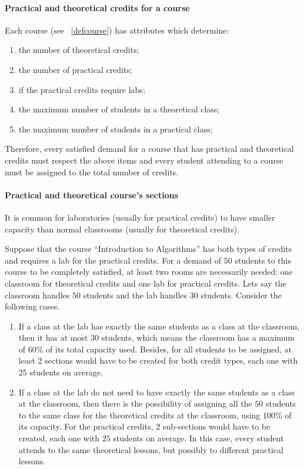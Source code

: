 \paragraph{Practical and theoretical credits for a course}
\label{constrptcourse}

Each course (see ~\ref{defcourse}) has attributes which determine:

\begin{enumerate}
\item the number of theoretical credits;
\item the number of practical credits;
\item if the practical credits require labs;
\item the maximum number of students in a theoretical class;
\item the maximum number of students in a practical class;
\end{enumerate}

Therefore, every satisfied demand for a course that has practical and theoretical credits must respect the above items and every student attending to a course must be assigned to the total number of credits.


\paragraph{Practical and theoretical course's sections}
\label{constrptrelation}

It is common for laboratories (usually for practical credits) to have smaller capacity than normal classrooms (usually for theoretical credits).

Suppose that the course ``Introduction to Algorithms'' has both types of credits and requires a lab for the practical credits.  For a demand of $50$ students to this course to be completely satisfied, at least two rooms are necessarily needed: one classroom for theoretical credits and one lab for practical credits. Lets say the classroom handles $50$ students and the lab handles $30$ students. Consider the following cases.
\begin{enumerate}
\item If a class at the lab has exactly the same students as a class at the classroom, then it has at most $30$ students, which means the classroom has a maximum of $60\%$ of its total capacity used. Besides, for all students to be assigned, at least $2$ sections would have to be created for both credit types, each one with $25$ students on average.
\item If a class at the lab do not need to have exactly the same students as a class at the classroom, then there is the possibility of assigning all the $50$ students to the same class for the theoretical credits at the classroom, using $100\%$ of its capacity. For the practical credits, $2$ sub-sections would have to be created, each one with $25$ students on average. In this case, every student attends to the same theoretical lessons, but possibly to different practical lessons.
\end{enumerate}

